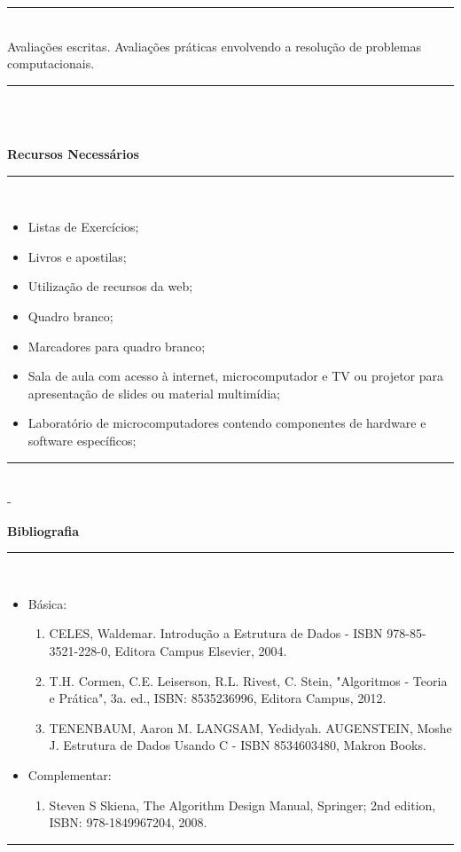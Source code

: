 \noindent\rule{16.5cm}{0.4pt}
\\
   Avaliações escritas. Avalia\c{c}\~oes pr\'aticas envolvendo a resolu\c{c}\~ao de problemas computacionais.\\
\noindent\rule{16.5cm}{0.4pt}\\
\\
\vspace{-12mm}
\begin{center}\textbf{Recursos Necessários}\end{center}
\vspace{-5mm}
\noindent\rule{16.5cm}{0.4pt}
\\
\begin{itemize} 
  \item Listas de Exercícios;
  \item Livros e apostilas;
  \item Utilização de recursos da web;
  \item Quadro branco;
  \item Marcadores para quadro branco;
  \item Sala de aula com acesso à internet, microcomputador e TV ou projetor para apresentação de slides ou material multimídia;
  \item Laboratório de microcomputadores contendo componentes de hardware e software específicos;
\end{itemize}
\noindent\rule{16.5cm}{0.4pt}\\ - 
\\
\vspace{-12mm}
\begin{center}\textbf{Bibliografia}\end{center}
\vspace{-5mm}
\noindent\rule{16.5cm}{0.4pt}
\\
\begin{itemize} 
  \item Básica:
	\begin{enumerate}
	\item CELES, Waldemar. Introdução a Estrutura de Dados -  ISBN 978-85-3521-228-0, Editora Campus Elsevier, 2004.
	\item T.H. Cormen, C.E. Leiserson, R.L. Rivest, C. Stein, "Algoritmos - Teoria e Prática", 3a. ed., ISBN: 8535236996, Editora Campus, 2012.
	\item TENENBAUM, Aaron M. LANGSAM, Yedidyah. AUGENSTEIN, Moshe J. Estrutura de Dados Usando C - ISBN 8534603480, Makron Books. 
	
	\end{enumerate}
  \item Complementar:
	\begin{enumerate} 
	\item Steven S Skiena, The Algorithm Design Manual, Springer; 2nd edition, ISBN: 978-1849967204, 2008.\\
	\end{enumerate}
\end{itemize}
\noindent\rule{16.5cm}{0.4pt}\\
\\
